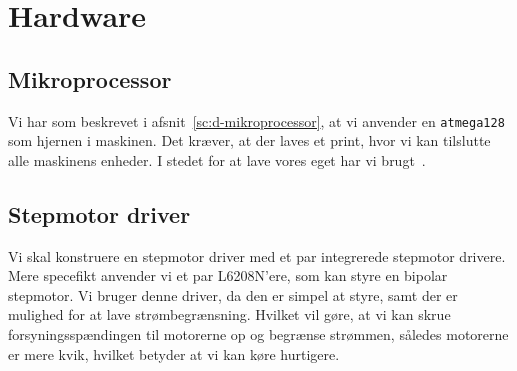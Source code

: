 \chapter[Implementering af hardware]{Hardware}


\section{Mikroprocessor}
Vi har som beskrevet i afsnit~\vref{sc:d-mikroprocessor}, at vi
anvender en \texttt{atmega128} som hjernen i maskinen. Det kræver, at
der laves et print, hvor vi kan tilslutte alle maskinens enheder. I
stedet for at lave vores eget har vi brugt~\cite{fronter:atmega128}.

\section{Stepmotor driver}
\label{sc:stepmotor-driver}
Vi skal konstruere en stepmotor driver med et par integrerede
stepmotor drivere. Mere specefikt anvender vi et par L6208N'ere, som
kan styre en bipolar stepmotor. Vi bruger denne driver, da den er
simpel at styre, samt der er mulighed for at lave
strømbegrænsning. Hvilket vil gøre, at vi kan skrue
forsyningsspændingen til motorerne op og begrænse strømmen, således
motorerne er mere kvik, hvilket betyder at vi kan køre hurtigere.



